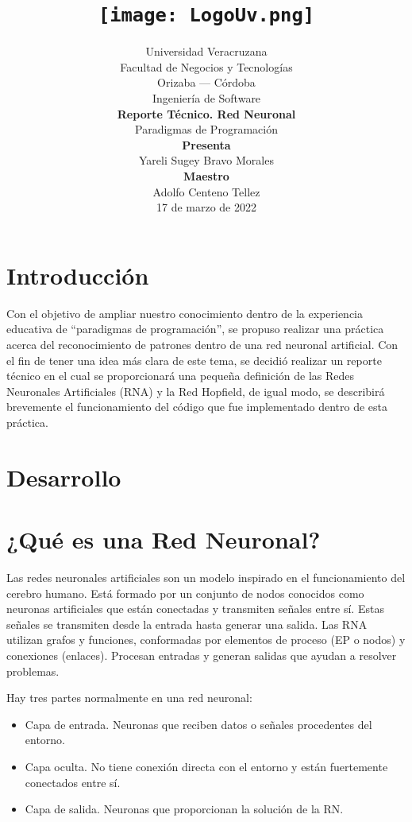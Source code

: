 \documentclass[12pt]{article}
\title{\texttt{[image: LogoUv.png]}}
\author{
        Universidad Veracruzana \\
        Facultad de Negocios y Tecnologías\\
        Orizaba --- Córdoba\\
        Ingeniería de Software\\
        \textbf{Reporte Técnico. Red Neuronal}\\
        Paradigmas de Programación\\
        \textbf{Presenta}\\
        Yareli Sugey Bravo Morales\\
        \textbf{Maestro}\\
        Adolfo Centeno Tellez\\
        17 de marzo de 2022\\
}
\date{}
\begin{document}
\maketitle

\newpage


\section{Introducción}

Con el objetivo de ampliar nuestro conocimiento dentro de la experiencia educativa de “paradigmas de programación”, se propuso realizar una práctica acerca del reconocimiento de patrones dentro de una red neuronal artificial. Con el fin de tener una idea más clara de este tema, se decidió realizar un reporte técnico en el cual se proporcionará una pequeña definición de las Redes Neuronales Artificiales (RNA) y la Red Hopfield, de igual modo, se describirá brevemente el funcionamiento del código que fue implementado dentro de esta práctica. 

\section{Desarrollo}
\section*{¿Qué es una Red Neuronal?}

Las redes neuronales artificiales son un modelo inspirado en el funcionamiento del cerebro humano. Está formado por un conjunto de nodos conocidos como neuronas artificiales que están conectadas y transmiten señales entre sí. Estas señales se transmiten desde la entrada hasta generar una salida. Las RNA utilizan grafos y funciones, conformadas por elementos de proceso (EP o nodos) y conexiones (enlaces). Procesan entradas y generan salidas que ayudan a resolver problemas. 

Hay tres partes normalmente en una red neuronal: 
\begin{itemize}
    \item Capa de entrada. Neuronas que reciben datos o señales procedentes del entorno.
    \item Capa oculta. No tiene conexión directa con el entorno y están fuertemente conectados entre sí. 
    \item Capa de salida. Neuronas que proporcionan la solución de la RN.

\end{itemize} 
\end{document}

